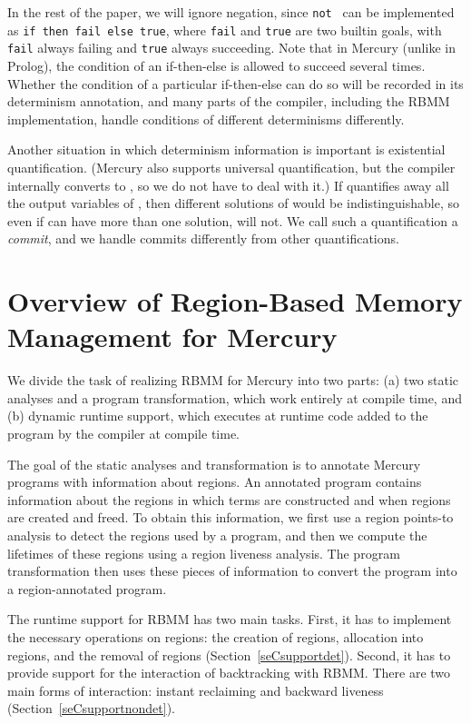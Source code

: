\documentclass{tlp}
\newcommand{\code}[1]{{\tt#1}}
\begin{document}
In the rest of the paper, we will ignore negation, since \code{not~} can
be implemented as \code{if  then fail else true},
where \code{fail} and \code{true} are two builtin goals,
with \code{fail} always failing and \code{true} always succeeding.
Note that in Mercury (unlike in Prolog),
the condition of an if-then-else is allowed to succeed several times.
Whether the condition of a particular if-then-else can do so
will be recorded in its determinism annotation,
and many parts of the compiler, including the RBMM implementation,
handle conditions of different determinisms differently.

Another situation in which determinism information is important
is existential quantification.
(Mercury also supports universal quantification,
but the compiler internally converts 
to ,
so we do not have to deal with it.)
If  quantifies away all the output variables of ,
then different solutions of  would be indistinguishable,
so even if  can have more than one solution,  will not.
We call such a quantification a \emph{commit},
and we handle commits differently from other quantifications.

\section{Overview of Region-Based Memory Management for Mercury}
\label{seCbgCmercuryRBMM}

We divide the task of realizing RBMM for Mercury into two parts:
(a) two static analyses and a program transformation,
which work entirely at compile time,
and (b) dynamic runtime support, which executes at runtime
code added to the program by the compiler at compile time.

The goal of the static analyses and transformation
is to annotate Mercury programs with information about regions.
An annotated program contains information about the regions
in which terms are constructed and when regions are created and freed.
To obtain this information, we first use
a region points-to analysis to detect the regions used by a program,
and then we compute the lifetimes of these regions
using a region liveness analysis.
The program transformation then uses these pieces of information
to convert the program into a region-annotated program.

The runtime support for RBMM has two main tasks.
First, it has to implement the necessary operations on regions:
the creation of regions, allocation into regions, and the removal of regions
(Section~\ref{seCsupportdet}).
Second, it has to provide support
for the interaction of backtracking with RBMM.
There are two main forms of interaction:
instant reclaiming and backward liveness
(Section~\ref{seCsupportnondet}).
\end{document}

